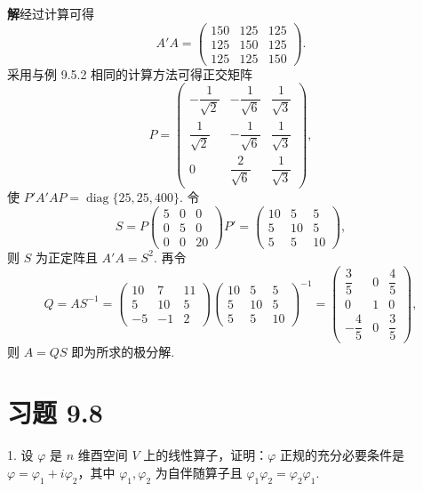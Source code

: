 \documentclass[UTF8, 12pt, fontset=fandol, oneside]{ctexart}
\begin{document}
\noindent\textbf{解}\quad 经过计算可得
\[
  A'A=
  \left(\begin{array}{ccc}
    150 & 125 & 125\\
    125 & 150 & 125\\
    125 & 125 & 150
  \end{array}\right).
\]
采用与例 9.5.2 相同的计算方法可得正交矩阵
\[
  P=
  \left(\begin{array}{ccc}
    -\dfrac1{\sqrt2} & -\dfrac1{\sqrt6} & \dfrac1{\sqrt3}\\
    \dfrac1{\sqrt2} & -\dfrac1{\sqrt6} & \dfrac1{\sqrt3}\\
    0 & \dfrac2{\sqrt6} & \dfrac1{\sqrt3}
  \end{array}\right),
\]
使 $P'A'AP=\operatorname{diag}\{25,25,400\}$. 令
\[
  S=P
  \left(\begin{array}{ccc}
    5 & 0 & 0\\
    0 & 5 & 0\\
    0 & 0 & 20
  \end{array}\right)
  P'
  =
  \left(\begin{array}{ccc}
    10 & 5 & 5\\
    5 & 10 & 5\\
    5 & 5 & 10
  \end{array}\right),
\]
则 $S$ 为正定阵且 $A'A=S^2$. 再令
\[
  Q=AS^{-1}=
  \left(\begin{array}{rrr}
    10 & 7 & 11\\
    5 & 10 & 5\\
    -5 & -1 & 2
  \end{array}\right)
  \left(\begin{array}{ccc}
    10 & 5 & 5\\
    5 & 10 & 5\\
    5 & 5 & 10
  \end{array}\right)^{-1}
  =
  \left(\begin{array}{ccc}
    \dfrac35 & 0 & \dfrac45\\
    0 & 1 & 0\\
    -\dfrac45 & 0 & \dfrac35
  \end{array}\right),
\]
则 $A=QS$ 即为所求的极分解.

\section*{习题 9.8}

1. 设 $\varphi$ 是 $n$ 维酉空间 $V$ 上的线性算子，证明：$\varphi$ 正规的充分必要条件是 $\varphi=\varphi_1+i\varphi_2$，其中 $\varphi_1,\varphi_2$ 为自伴随算子且 $\varphi_1\varphi_2=\varphi_2\varphi_1$.
\end{document}
